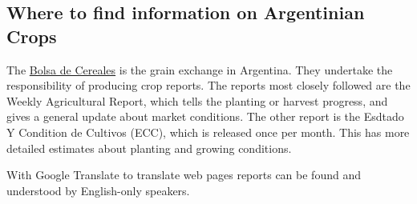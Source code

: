 \documentclass[
]{book}
\begin{document}
\hypertarget{where-to-find-information-on-argentinian-crops}{%
\subsection{Where to find information on Argentinian Crops}\label{where-to-find-information-on-argentinian-crops}}

The \href{https://www.bolsadecereales.com/}{Bolsa de Cereales} is the grain exchange in Argentina. They undertake the responsibility of producing crop reports. The reports most closely followed are the Weekly Agricultural Report, which tells the planting or harvest progress, and gives a general update about market conditions. The other report is the Esdtado Y Condition de Cultivos (ECC), which is released once per month. This has more detailed estimates about planting and growing conditions.

With Google Translate to translate web pages reports can be found and understood by English-only speakers.

  
\end{document}
